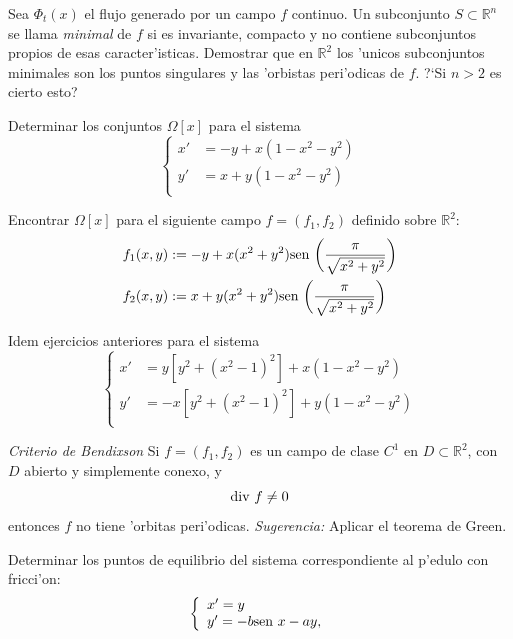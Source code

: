 \begin{ejercicio}{} Sea $\Phi_t(x)$ el flujo generado por un campo
$f$ continuo. Un subconjunto $S\subset\mathbb{R}^n$ se llama
\emph{minimal} de $f$ si es invariante, compacto y no contiene
subconjuntos propios de esas caracter'isticas. Demostrar que en
$\mathbb{R}^2$ los 'unicos subconjuntos minimales son los puntos
singulares y las 'orbistas peri'odicas de $f$. ?`Si $n>2$ es
cierto esto?

\end{ejercicio}

\begin{ejercicio}{} Determinar los conjuntos $\Omega[x]$ para el
sistema
\[
  \left\{%
\begin{array}{ll}
 x'&=-y+x(1-x^2-y^2)\\
    y'&=x+y(1-x^2-y^2)\\
\end{array}%
\right.
\]
\end{ejercicio}

\begin{ejercicio}{} Encontrar $\Omega[x]$ para el siguiente
campo $f=(f_1,f_2)$
 definido sobre $\mathbb{R}^2$:
\[
\begin{split}
  f_1(x,y)&:=-y+x(x^2+y^2)\hbox{sen }
  \bigg(\frac{\pi}{\sqrt{x^2+y^2}}\bigg)\\
      f_2(x,y)&:=x+y(x^2+y^2)\hbox{sen
 }\bigg(\frac{\pi}{\sqrt{x^2+y^2}}\bigg)\\
 \end{split}
\]
\end{ejercicio}

\begin{ejercicio}{} Idem ejercicios anteriores para el sistema
 \[
   \left\{%
 \begin{array}{ll}
  x'&=y[y^2+(x^2-1)^2]+x(1-x^2-y^2)\\
     y'&=-x[y^2+(x^2-1)^2]+y(1-x^2-y^2)\\
 \end{array}%
\right.
 \]
\end{ejercicio}

\begin{ejercicio}{} \emph{Criterio de Bendixson} Si $f=(f_1,f_2)$ es
un campo de clase $C^1$ en $D\subset\mathbb{R}^2$, con $D$ abierto
y simplemente conexo, y
\[
    \hbox{div }f\neq 0
\]
 entonces $f$ no tiene 'orbitas
peri'odicas. \emph{Sugerencia:} Aplicar el teorema de Green.
\end{ejercicio}
\begin{ejercicio}{} Determinar los puntos de equilibrio del
 sistema correspondiente al p'edulo con fricci'on:
\[
    \left\{%
\begin{array}{ll}
    x'=y \\
    y'=-b\hbox{sen }x-ay, \\
\end{array}%
\right.
\]
\end{ejercicio}




